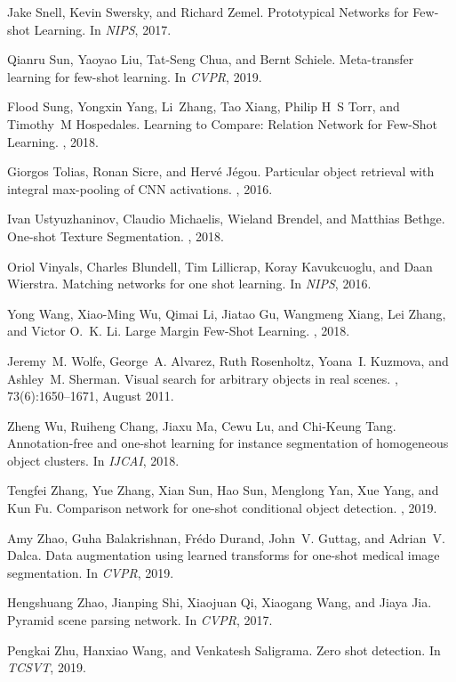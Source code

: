 \documentclass{article}
\begin{document}
{\begin{thebibliography}{10}
Jake Snell, Kevin Swersky, and Richard Zemel.
\newblock Prototypical {Networks} for {Few}-shot {Learning}.
\newblock In {\em {NIPS}}, 2017.

Qianru Sun, Yaoyao Liu, Tat{-}Seng Chua, and Bernt Schiele.
\newblock Meta-transfer learning for few-shot learning.
\newblock In {\em CVPR}, 2019.

Flood Sung, Yongxin Yang, Li~Zhang, Tao Xiang, Philip H~S Torr, and Timothy~M
  Hospedales.
\newblock Learning to {Compare}: {Relation} {Network} for {Few}-{Shot}
  {Learning}.
, 2018.

Giorgos Tolias, Ronan Sicre, and Hervé Jégou.
\newblock Particular object retrieval with integral max-pooling of {CNN}
  activations.
, 2016.

Ivan Ustyuzhaninov, Claudio Michaelis, Wieland Brendel, and Matthias Bethge.
\newblock One-shot {Texture} {Segmentation}.
, 2018.

Oriol Vinyals, Charles Blundell, Tim Lillicrap, Koray Kavukcuoglu, and Daan
  Wierstra.
\newblock Matching networks for one shot learning.
\newblock In {\em {NIPS}}, 2016.

Yong Wang, Xiao-Ming Wu, Qimai Li, Jiatao Gu, Wangmeng Xiang, Lei Zhang, and
  Victor O.~K. Li.
\newblock Large {Margin} {Few}-{Shot} {Learning}.
, 2018.

Jeremy~M. Wolfe, George~A. Alvarez, Ruth Rosenholtz, Yoana~I. Kuzmova, and
  Ashley~M. Sherman.
\newblock Visual search for arbitrary objects in real scenes.
, 73(6):1650--1671,
  August 2011.

Zheng Wu, Ruiheng Chang, Jiaxu Ma, Cewu Lu, and Chi-Keung Tang.
\newblock Annotation-free and one-shot learning for instance segmentation of
  homogeneous object clusters.
\newblock In {\em IJCAI}, 2018.

Tengfei Zhang, Yue Zhang, Xian Sun, Hao Sun, Menglong Yan, Xue Yang, and Kun
  Fu.
\newblock Comparison network for one-shot conditional object detection.
, 2019.

Amy Zhao, Guha Balakrishnan, Fr{\'{e}}do Durand, John~V. Guttag, and Adrian~V.
  Dalca.
\newblock Data augmentation using learned transforms for one-shot medical image
  segmentation.
\newblock In {\em {CVPR}}, 2019.

Hengshuang Zhao, Jianping Shi, Xiaojuan Qi, Xiaogang Wang, and Jiaya Jia.
\newblock Pyramid scene parsing network.
\newblock In {\em {CVPR}}, 2017.

Pengkai Zhu, Hanxiao Wang, and Venkatesh Saligrama.
\newblock Zero shot detection.
\newblock In {\em TCSVT}, 2019.

\end{thebibliography}
 }
\end{document}
